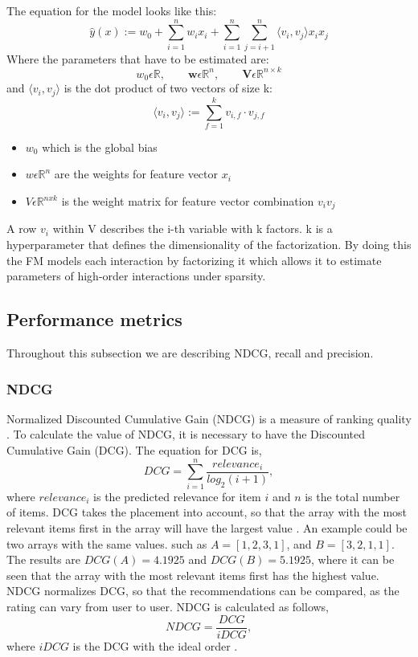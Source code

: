 The equation for the model looks like this:
\[ \hat{y}(x) := w_0 + \sum_{i=1}^{n} w_ix_i + \sum_{i=1}^{n}\sum_{j=i+1}^{n} \big \langle v_i,v_j \big \rangle x_ix_j \]
Where the parameters that have to be estimated are:
\[ w_0 \epsilon \mathbb{R}, \qquad \mathbf{w} \epsilon \mathbb{R}^n, \qquad  \mathbf{V}\epsilon \mathbb{R}^{n \times k} \]
and $\big \langle v_i,v_j \big \rangle$ is the dot product of two vectors of size k:
\[ \big \langle v_i,v_j \big \rangle := \sum_{f=1}^{k} v_{i,f} \cdot v_{j,f}\]

\begin{itemize}
	\item $w_0$ which is the global bias
	\item $w \epsilon \mathbb{R}^n$ are the weights for feature vector $x_i$
	\item $V \epsilon \mathbb{R}^{nxk}$ is the weight matrix for feature vector combination $v_iv_j$
\end{itemize}
A row $v_i$ within V describes the i-th variable with k factors.
k is a hyperparameter that defines the dimensionality of the factorization.
By doing this the FM models each interaction by factorizing it which allows it to estimate parameters of high-order interactions under sparsity.
\subsection{Performance metrics}
Throughout this subsection we are describing NDCG, recall and precision.

\subsubsection{NDCG}
Normalized Discounted Cumulative Gain (NDCG) is a measure of ranking quality \cite{NDCG-evaluation}.
To calculate the value of NDCG, it is necessary to have the Discounted Cumulative Gain (DCG).
The equation for DCG is,
\begin{equation}
    DCG = \sum_{i=1}^{n} \frac{relevance_i}{log_2(i+1)},
\end{equation}
where $relevance_i$ is the predicted relevance for item $i$ and $n$ is the total number of items.
DCG takes the placement into account, so that the array with the most relevant items first in the array will have the largest value \cite{NDCG-evaluation,Handbook}.
An example could be two arrays with the same values. such as $A = [1, 2, 3, 1]$, and $B = [3, 2, 1, 1]$. The results are $DCG(A) = 4.1925$ and $DCG(B) = 5.1925$, where it can be seen that the array with the most relevant items first has the highest value.
NDCG normalizes DCG, so that the recommendations can be compared, as the rating can vary from user to user.
NDCG is calculated as follows,
\begin{equation}
    NDCG = \frac{DCG}{iDCG},
\end{equation}
where $iDCG$ is the DCG with the ideal order \cite{NDCG-evaluation,Handbook}.

